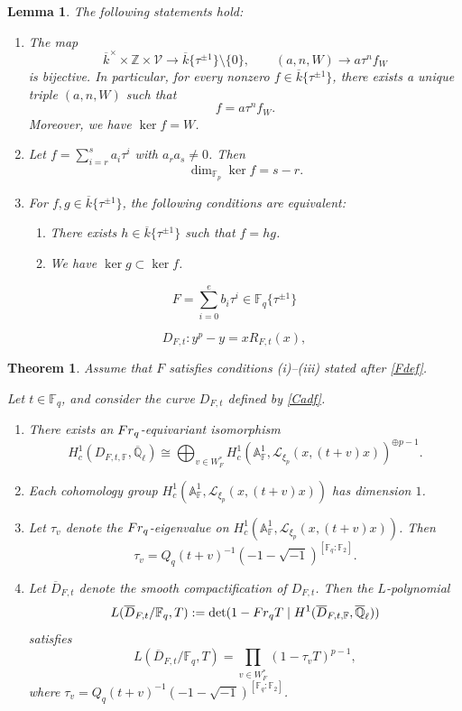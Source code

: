 \documentclass[10pt,a4paper]{amsart}
\newtheorem{lemma}{Lemma}
\newtheorem{theorem}{Theorem}
\def\A{{\mathbb A}}
\def\F{{\mathbb F}}
\def\Ql{\overline{\mathbb{Q}}_\ell}
\begin{document}
\begin{lemma}\label{basic}
The following statements hold: 
\begin{enumerate}
\item The map 
\[\overline{k}^\times\times\mathbb{Z}\times{\mathcal V}\to \overline{k}\{\tau^{\pm1}\}\setminus\{0\},\qquad (a,n,W) \to a\tau^nf_W \]
 is bijective. In particular, for every nonzero $f\in \overline{k}\{\tau^{\pm1}\}$, there exists a unique triple $(a,n,W)$ such that 
 \[
 f=a\tau^nf_W. 
 \]
 Moreover, we have $\ker f=W$. 
 
\item Let $f=\sum_{i=r}^sa_i\tau^i$ with $a_ra_s\neq0$. Then 
\[\dim_{\F_p}\ker f=s-r. \]
\item For $f,g\in\overline{k}\{\tau^{\pm1}\}$, the following conditions are equivalent: 
\begin{enumerate}
\item There exists $h\in\overline{k}\{\tau^{\pm1}\}$ such that $f=hg$. 
\item We have $\ker g\subset \ker f$. 
\end{enumerate}
\end{enumerate}
\end{lemma}

 \begin{equation}\label{Fdef}
 F=\sum_{i=0}^eb_i\tau^i \in \F_q\{\tau^{\pm1}\}
 \end{equation}

\begin{equation}\label{Cadf}
D_{F,t}\colon y^p - y = x R_{F,t}(x), 
\end{equation}

 \begin{theorem}\label{FEV1}
 Assume that $F$ satisfies conditions \textup{(i)--(iii)} stated after \eqref{Fdef}. 
 
 Let $t\in\F_q$, and consider the curve $D_{F,t}$ defined by \eqref{Cadf}. 
  \begin{enumerate}
 \item 
 There exists an ${\rm Fr}_q$-equivariant isomorphism 
 \[H^1_c(D_{F,t,\F},\Ql)\cong \bigoplus_{v\in W_F^\ast}H^1_c(\A^1_{\F},{\mathcal L}_{\xi_p}(x,(t+v)x))^{\oplus p-1}. \]
 \item Each cohomology group $H^1_c(\A^1_{\F},{\mathcal L}_{\xi_p}(x,(t+v)x))$ has dimension $1$. 
 \item Let $\tau_v$ denote the ${\rm Fr}_q$-eigenvalue on  $H^1_c(\A^1_{\F},{\mathcal L}_{\xi_p}(x,(t+v)x))$.  Then 
 \[\tau_v=Q_q(t+v)^{-1}(-1-\sqrt{-1})^{[\F_q:\F_2]}.\]
 \item 
  Let $\overline{D}_{F,t}$ denote the smooth compactification of $D_{F,t}$. Then the $L$-polynomial 
\[
L(\overline{D}_{F,t}/\F_q,T):=\det(1-{\rm Fr}_qT \mid H^1(\overline{D}_{F,t,\F},\Ql))
\]
satisfies 
\[
L(\overline{D}_{F,t}/\F_q,T)=
\prod_{v\in W_F^\ast}(1-\tau_v T)^{p-1},
\]
where $\tau_v=Q_q(t+v)^{-1}(-1-\sqrt{-1})^{[\F_q:\F_2]}$. 
 \end{enumerate}
 \end{theorem}
\end{document}
